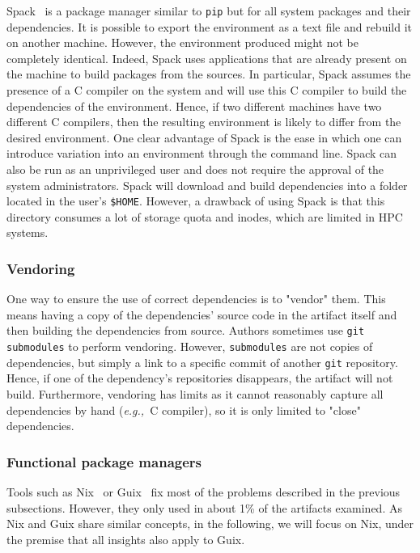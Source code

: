 \documentclass[sigconf,natbib=false]{acmart}
\newcommand{\eg}{\emph{e.g.,}}
\begin{document}
Spack\ \cite{gamblin_spack_2015} is a package manager similar to \texttt{pip} but for all system packages and their dependencies.
It is possible to export the environment as a text file and rebuild it on another machine.
However, the environment produced might not be completely identical.
Indeed, Spack uses applications that are already present on the machine to build packages from the sources.
In particular, Spack assumes the presence of a C compiler on the system and will use this C compiler to build the dependencies of the environment.
Hence, if two different machines have two different C compilers, then the resulting environment is likely to differ from the desired environment.
One clear advantage of Spack is the ease in which one can introduce variation into an environment through the command line.
Spack can also be run as an unprivileged user and does not require the approval of the system administrators.
Spack will download and build dependencies into a folder located in the user's \texttt{\$HOME}.
However, a drawback of using Spack is that this directory consumes a lot of storage quota and inodes, which are limited in HPC systems.

\subsubsection{Vendoring}

One way to ensure the use of correct dependencies is to "vendor" them.
This means having a copy of the dependencies' source code in the artifact itself and then building the dependencies from source.
Authors sometimes use \texttt{git submodules} to perform vendoring.
However, \texttt{submodules} are not copies of dependencies, but simply a link to a specific commit of another \texttt{git} repository.
Hence, if one of the dependency's repositories disappears, the artifact will not build.
Furthermore, vendoring has limits as it cannot reasonably capture all dependencies by hand (\eg\ C compiler), so it is only limited to "close" dependencies.

\subsubsection{Functional package managers}

Tools such as Nix\ \cite{dolstra_nix_2004} or Guix\ \cite{courtes_functional_2013} fix most of the problems described in the previous subsections.
However, they only used in about 1\% of the artifacts examined.
As Nix and Guix share similar concepts, in the following, we will focus on Nix, under the premise that all insights also apply to Guix.
\end{document}
